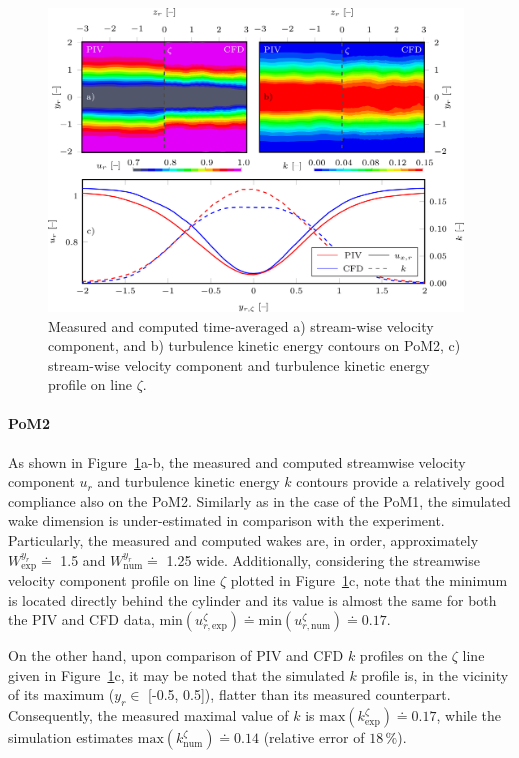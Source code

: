 \begin{figure}[htbp]
    \includegraphics[width=0.98\textwidth]{02_images/00_export/figure6.png}
    \caption{Measured and computed time-averaged a) stream-wise velocity component, and b) turbulence kinetic energy contours on PoM2, c) stream-wise velocity component and turbulence kinetic energy profile on line $\zeta$.}
    \label{fig:meansPom2}
\end{figure}

\paragraph{PoM2}
As shown in Figure~\ref{fig:meansPom2}a-b, the measured and computed streamwise velocity component $u_r$ and turbulence kinetic energy $k$ contours provide {a} relatively good compliance {also on the PoM2}. Similarly as in the case of the PoM1, the simulated wake dimension is under-estimated in comparison with the experiment. Particularly, the measured and computed wakes are, in order, approximately $W_{\mathrm{exp}}^{y_{r}} \doteq$ 1.5 and $W_{\mathrm{num}}^{y_{r}} \doteq$ 1.25 wide. Additionally, considering {the} streamwise velocity component profile on line $\zeta$ {plotted} in Figure~\ref{fig:meansPom2}c, note that the minimum is located directly behind the cylinder and its value is almost {the} same for both {the} PIV and CFD data, $\mathrm{min}(u_{r,\mathrm{exp}}^{\zeta}) \doteq \mathrm{min}(u_{r,\mathrm{num}}^{\zeta})\doteq 0.17 $.

On the other hand, {upon comparison of} PIV and CFD {$k$} profiles on {the} $\zeta$ line {given} in Figure~\ref{fig:meansPom2}c, {it may be noted} that the simulated $k$ profile {is, in the vicinity of its} maximum ($y_r\in$ [-0.5, 0.5]){,} {flatter than its measured counterpart}. Consequently, the measured maximal value of $k$ is $\mathrm{max}(k_{\mathrm{exp}}^{\zeta})\doteq 0.17$, while the simulation {estimates} $\mathrm{max}(k_{\mathrm{num}}^{\zeta})\doteq 0.14$ (relative error of $18\,\%$).

